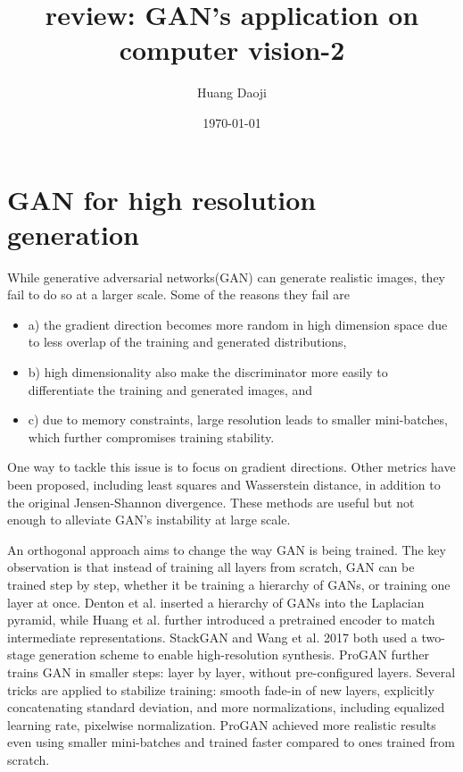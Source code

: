 \documentclass{article}
\author{Huang Daoji}
\title{review: GAN's application on computer vision-2}
\date{\today}
\begin{document}
\maketitle

\section{GAN for high resolution generation}

While generative adversarial networks(GAN)\cite{NIPS2014_5423} can generate realistic images, they fail to do so at a larger scale. Some of the reasons they fail are

\begin{itemize}
    \item  a) the gradient direction becomes more random in high dimension space due to less overlap of the training and generated distributions,
    \item b) high dimensionality also make the discriminator more easily to differentiate the training and generated images, and
    \item c) due to memory constraints, large resolution leads to smaller mini-batches, which further compromises training stability.
\end{itemize}

One way to tackle this issue is to focus on gradient directions. Other metrics have been proposed, including least squares\cite{Mao2017LeastSG} and Wasserstein distance\cite{pmlr-v70-arjovsky17a}, in addition to the original Jensen-Shannon divergence. These methods are useful but not enough to alleviate GAN's instability at large scale.


An orthogonal approach aims to change the way GAN is being trained. The key observation is that instead of training all layers from scratch, GAN can be trained step by step, whether it be training a hierarchy of GANs, or training one layer at once. Denton et al.\cite{NIPS2015_5773} inserted a hierarchy of GANs into the Laplacian pyramid, while Huang et al.\cite{8099685} further introduced a pretrained encoder to match intermediate representations. StackGAN\cite{han2017stackgan} and Wang et al. 2017\cite{8579015} both used a two-stage generation scheme to enable high-resolution synthesis. ProGAN\cite{Karras2018ProgressiveGO} further trains GAN in smaller steps: layer by layer, without pre-configured layers. Several tricks are applied to stabilize training: smooth fade-in of new layers, explicitly concatenating standard deviation, and more normalizations, including equalized learning rate, pixelwise normalization. ProGAN achieved more realistic results even using smaller mini-batches and trained faster compared to ones trained from scratch.
\end{document}
